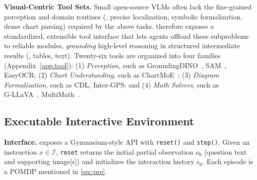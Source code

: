 \noindent \textbf{Visual-Centric Tool Sets.}
Small open-source VLMs often lack the fine-grained perception and domain routines (\eg, precise localization, symbolic formalization, dense chart parsing) required by the above tasks. 
\env{} therefore exposes a standardized, extensible tool interface that lets agents offload these subproblems to reliable modules, \emph{grounding} high-level reasoning in structured intermediate results (\eg, tables, text). 
Twenty-six tools are organized into four families (Appendix~\ref{app:tool}): 
(1) \emph{Perception}, such as GroundingDINO~\cite{liu2023grounding}, SAM~\cite{kirillov2023segment}, EasyOCR;
(2) \emph{Chart Understanding}, such as ChartMoE~\cite{xu2025chartmoe};
(3) \emph{Diagram Formalization}, such as CDL, Inter‑GPS;
and (4) \emph{Math Solvers}, such as G‑LLaVA~\cite{gao2025gllava}, MultiMath~\cite{peng2024multimath}.

\subsection{Executable Interactive Environment} \label{sec:4.2}

\noindent \textbf{Interface.}
\env{} exposes a Gymnasium-style API with \texttt{reset()} and \texttt{step()}.
Given an instruction $x\in\mathcal{I}$, \texttt{reset} returns the initial partial observation $o_0$ (question text and supporting image[s]) and initializes the interaction history $c_0$.
Each episode is a POMDP mentioned in \cref{sec:pre}. 




